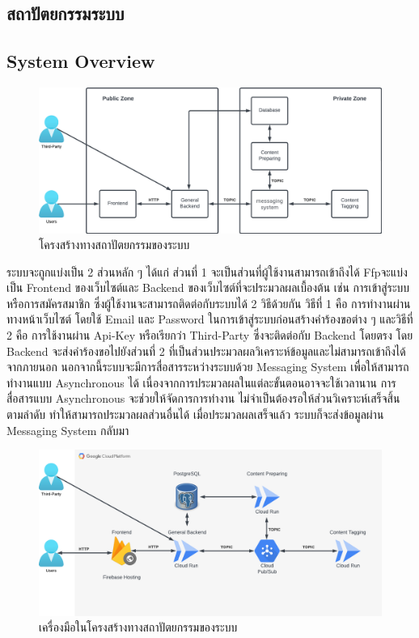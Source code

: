 \documentclass[12pt,oneside,openright,a4paper]{cpe-thai-project}
\begin{document}
\begin{itemize}
\section{สถาปัตยกรรมระบบ}
\subsection{System Overview}
  \begin{figure}[!ht]\centering
    \includegraphics[width=\textwidth]{./img/architechture_simple.png}
    \caption{โครงสร้างทางสถาปัตยกรรมของระบบ}\label{fig:architecture_simple} 
  \end{figure}
  \newpage
  \hspace{1cm}ระบบจะถูกแบ่งเป็น 2 ส่วนหลัก ๆ ได้แก่ ส่วนที่ 1 จะเป็นส่วนที่ผู้ใช้งานสามารถเข้าถึงได้ 
  Ffpจะแบ่งเป็น Frontend ของเว็บไซต์และ Backend ของเว็บไซต์ที่จะประมวลผลเบื้องต้น เช่น การเข้าสู่ระบบหรือการสมัครสมาชิก 
  ซึ่งผู้ใช้งานจะสามารถติดต่อกับระบบได้ 2 วิธีด้วยกัน วิธีที่ 1 คือ การทำงานผ่านทางหน้าเว็บไซต์ โดยใช้ Email และ Password ในการเข้าสู่ระบบก่อนสร้างคำร้องขอต่าง ๆ 
  และวิธีที่ 2 คือ การใช้งานผ่าน Api-Key หรือเรียกว่า Third-Party ซึ่งจะติดต่อกับ Backend โดยตรง 
  โดย Backend จะส่งคำร้องขอไปยังส่วนที่ 2 ที่เป็นส่วนประมวลผลวิเคราะห์ข้อมูลและไม่สามารถเข้าถึงได้จากภายนอก 
  นอกจากนี้ระบบจะมีการสื่อสารระหว่างระบบด้วย Messaging System เพื่อให้สามารถทำงานแบบ Asynchronous ได้ 
  เนื่องจากการประมวลผลในแต่ละขั้นตอนอาจจะใช้เวลานาน การสื่อสารแบบ Asynchronous จะช่วยให้จัดการการทำงาน ไม่จำเป็นต้องรอให้ส่วนวิเคราะห์เสร็จสิ้นตามลำดับ 
  ทำให้สามารถประมวลผลส่วนอื่นได้ เมื่อประมวลผลเสร็จแล้ว ระบบก็จะส่งข้อมูลผ่าน Messaging System กลับมา
  \begin{figure}[!ht]\centering
    \includegraphics[width=\textwidth]{./img/architechture.png}
    \caption{เครื่องมือในโครงสร้างทางสถาปัตยกรรมของระบบ}\label{fig:architecture} 
  \end{figure}
  

\end{itemize}
\end{document}

